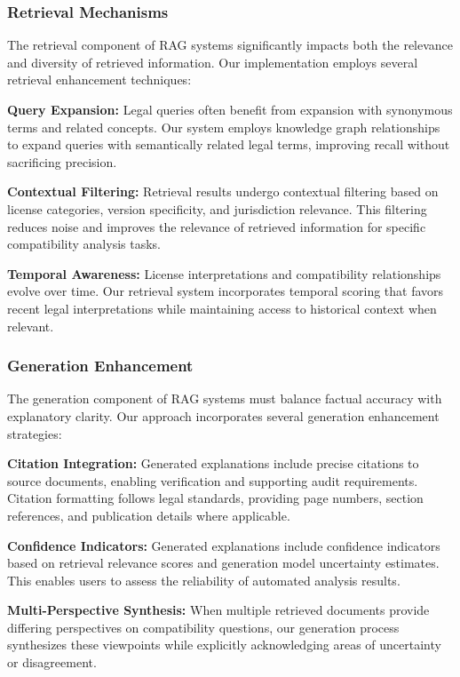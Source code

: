 \documentclass[9pt,twocolumn]{article}
\begin{document}
\subsubsection{Retrieval Mechanisms}
The retrieval component of RAG systems significantly impacts both the relevance and diversity of retrieved information. Our implementation employs several retrieval enhancement techniques:

\textbf{Query Expansion:} Legal queries often benefit from expansion with synonymous terms and related concepts. Our system employs knowledge graph relationships to expand queries with semantically related legal terms, improving recall without sacrificing precision.

\textbf{Contextual Filtering:} Retrieval results undergo contextual filtering based on license categories, version specificity, and jurisdiction relevance. This filtering reduces noise and improves the relevance of retrieved information for specific compatibility analysis tasks.

\textbf{Temporal Awareness:} License interpretations and compatibility relationships evolve over time. Our retrieval system incorporates temporal scoring that favors recent legal interpretations while maintaining access to historical context when relevant.

\subsubsection{Generation Enhancement}
The generation component of RAG systems must balance factual accuracy with explanatory clarity. Our approach incorporates several generation enhancement strategies:

\textbf{Citation Integration:} Generated explanations include precise citations to source documents, enabling verification and supporting audit requirements. Citation formatting follows legal standards, providing page numbers, section references, and publication details where applicable.

\textbf{Confidence Indicators:} Generated explanations include confidence indicators based on retrieval relevance scores and generation model uncertainty estimates. This enables users to assess the reliability of automated analysis results.

\textbf{Multi-Perspective Synthesis:} When multiple retrieved documents provide differing perspectives on compatibility questions, our generation process synthesizes these viewpoints while explicitly acknowledging areas of uncertainty or disagreement.
\end{document}
